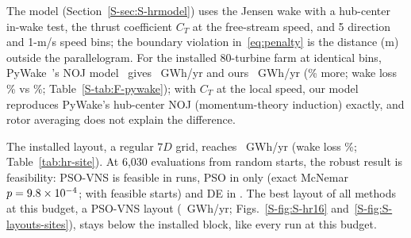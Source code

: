 The model (Section~\ref{S-sec:S-hrmodel}) uses the Jensen wake with a hub-center in-wake test, the thrust coefficient $C_T$ at the free-stream speed, and 5\textdegree{} direction and 1-m/s speed bins; the boundary violation in~\eqref{eq:penalty} is the distance (m) outside the parallelogram. For the installed 80-turbine farm at identical bins, PyWake~\NFPyWakeVersion's NOJ model~\cite{PyWake} gives \NFPyWakeAEP~GWh/yr and ours \NFPyWakeOurAEP~GWh/yr (\NFPyWakeDiffPct\% more; wake loss \NFPyWakeOurLossPct\% vs \NFPyWakeLossPct\%; Table~\ref{S-tab:F-pywake}); with $C_T$ at the local speed, our model reproduces PyWake's hub-center NOJ (momentum-theory induction) exactly, and rotor averaging does not explain the difference.

The installed layout, a regular $7D$ grid, reaches \NHRInstalled~GWh/yr (wake loss \NHRInstalledLoss\%; Table~\ref{tab:hr-site}). At 6,030 evaluations from random starts, the robust result is feasibility: PSO-VNS is feasible in \NHRFeasPSOVNS{} runs, PSO in only \NHRFeasPSO{} (exact McNemar $p=9.8\times10^{-4}$; \NHRFeasFeasInitPSO{} with feasible starts) and DE in \NHRFeasDE. The best layout of all methods at this budget, a PSO-VNS layout (\NHRBestPSOVNS~GWh/yr; Figs.~\ref{S-fig:S-hr16} and~\ref{S-fig:S-layouts-sites}), stays below the installed block, like every run at this budget.

